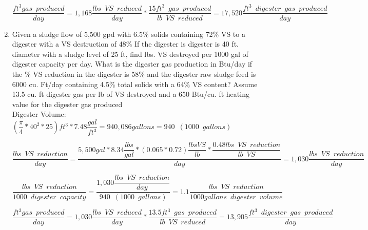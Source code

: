 \documentclass{article}
\begin{document}
\begin{enumerate}
{
$
	\dfrac 
	{
	ft^3 gas \enspace produced
	}
	{
	day
	}
	=
	1,168 \dfrac
			{
			lbs \enspace VS \enspace reduced
			}
			{
			day
			}
			*
		\dfrac
		{
		15 ft^3 \enspace gas \enspace produced
		}
		{
		lb \enspace VS \enspace reduced
		}
		=17,520 \dfrac
				{
				ft^3 \enspace digester \enspace 					gas \enspace produced
				}
				{
				day
				}
$
} 


\item Given a sludge flow of 5,500 gpd with 6.5\% solids containing  72\% VS to a digester with a VS destruction of 48\%   If the digester is digester is 40 ft. diameter with a sludge level of 25 ft, find lbs. VS destroyed per 1000 gal of digester capacity per day.  What is the digester gas production in Btu/day if the \% VS reduction in the digester is 58\% and the digester raw sludge feed is 6000 cu. Ft/day containing 4.5\% total solids with a 64\% VS content?  Assume 13.5 cu. ft digester gas per lb of VS destroyed and a 650 Btu/cu. ft heating value for the digester gas produced\\

{
Digester Volume: 
$
{
		(\dfrac
			{\pi}
			{4}*40^2*25)ft^3 *7.48 \dfrac{gal}{ft^3}
	}=940,086 gallons=940 \enspace(1000 \enspace gallons)
$
}\\
\vspace{3mm}

{
$
	\dfrac
	{
	lbs \enspace VS \enspace reduction
	}
	{
	day
	}
	=
	\dfrac
	{
	5,500 gal * 8.34 \dfrac{lbs}{gal}*(0.065*0.72) \dfrac{lbs VS}{lb}*\dfrac{0.48 lbs \enspace VS \enspace  reduction}{lb \enspace VS}
	}
	{
	day
	}
 	=1,030
	\dfrac
	{
	lbs \enspace VS \enspace reduction
	}
	{
	day 
	}
$
}\\
\vspace{3mm}


{
$
	\dfrac
	{
	lbs \enspace VS \enspace reduction
	}
	{
	1000 \enspace digester \enspace capacity
	}
	=
	\dfrac
	{
	1,030 \dfrac
			{
			lbs \enspace VS \enspace reduction
			}
			{
			day
			}
	}
	{	
	940 \enspace (1000 \enspace gallons)
	}
 	=1.1
	\dfrac
	{
	lbs \enspace VS \enspace reduction
	}
	{
	1000 gallons \enspace digester \enspace volume 
	}
$
}\\
\vspace{3mm}


{
$
	\dfrac 
	{
	ft^3 gas \enspace produced
	}
	{
	day
	}
	=
	1,030 \dfrac
			{
			lbs \enspace VS \enspace reduced
			}
			{
			day
			}
			*
		\dfrac
		{
		13.5 ft^3 \enspace gas \enspace produced
		}
		{
		lb \enspace VS \enspace reduced
		}
		=13,905 \dfrac
				{
				ft^3 \enspace digester \enspace 					gas \enspace produced
				}
				{
				day
				}
$
}\\
\vspace{3mm}




\end{enumerate}
\end{document}

